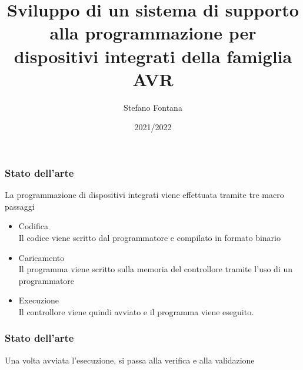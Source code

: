 \documentclass[aspectratio=169]{beamer}
\title[Relazione Finale]{Sviluppo di un sistema di supporto alla programmazione per dispositivi integrati della famiglia AVR}
\author[S.Fontana Matr. 727199]{Stefano Fontana}
\date{2021/2022}
\begin{document}
    \maketitle

    \begin{frame}
        \frametitle{Stato dell'arte}

        La programmazione di dispositivi integrati viene effettuata tramite tre macro passaggi

        \begin{itemize}
            \item<1-> Codifica \\
            {\footnotesize Il codice viene scritto dal programmatore e compilato in formato binario}
            \item<2-> Caricamento \\
            {\footnotesize Il programma viene scritto sulla memoria del controllore tramite l'uso di un programmatore}
            \item<3-> Execuzione\\
            {\footnotesize Il controllore viene quindi avviato e il programma viene eseguito.}
        \end{itemize}
    
    \end{frame}

    \begin{frame}
        \frametitle{Stato dell'arte}

        Una volta avviata l'esecuzione, si passa alla verifica e alla validazione

        \begin{figure}
        \end{figure}

    \end{frame}
    \note{
        
    }
\end{document}
